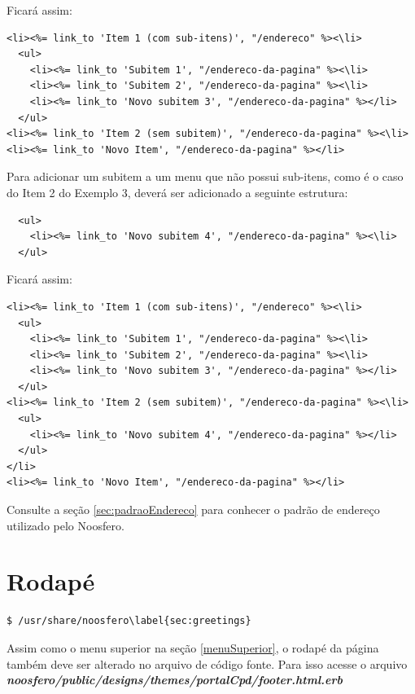 \newpage
Ficará assim:

\begin{verbatim}
<li><%= link_to 'Item 1 (com sub-itens)', "/endereco" %><\li>
  <ul>
    <li><%= link_to 'Subitem 1', "/endereco-da-pagina" %><\li>
    <li><%= link_to 'Subitem 2', "/endereco-da-pagina" %><\li>
    <li><%= link_to 'Novo subitem 3', "/endereco-da-pagina" %></li>
  </ul>
<li><%= link_to 'Item 2 (sem subitem)', "/endereco-da-pagina" %><\li>
<li><%= link_to 'Novo Item', "/endereco-da-pagina" %></li>
\end{verbatim}

Para adicionar um subitem a um menu que não possui sub-itens, como é o caso do Item 2 do Exemplo 3, deverá ser adicionado a seguinte estrutura:

\begin{verbatim}
  <ul>
    <li><%= link_to 'Novo subitem 4', "/endereco-da-pagina" %><\li>
  </ul>
\end{verbatim}

Ficará assim:

\begin{verbatim}
<li><%= link_to 'Item 1 (com sub-itens)', "/endereco" %><\li>
  <ul>
    <li><%= link_to 'Subitem 1', "/endereco-da-pagina" %><\li>
    <li><%= link_to 'Subitem 2', "/endereco-da-pagina" %><\li>
    <li><%= link_to 'Novo subitem 3', "/endereco-da-pagina" %></li>
  </ul>
<li><%= link_to 'Item 2 (sem subitem)', "/endereco-da-pagina" %><\li>
  <ul>
    <li><%= link_to 'Novo subitem 4', "/endereco-da-pagina" %></li>
  </ul>
</li>
<li><%= link_to 'Novo Item', "/endereco-da-pagina" %></li>
\end{verbatim}

Consulte a seção \ref{sec:padraoEndereco} para conhecer o padrão de endereço utilizado pelo Noosfero.

\newpage
\section{Rodapé}

\begin{lstlisting}
$ /usr/share/noosfero\label{sec:greetings}
\end{lstlisting}

Assim como o menu superior na seção \ref{menuSuperior}, o rodapé da página também deve ser alterado no arquivo de código fonte. Para isso acesse o arquivo \textbf{\textit{noosfero/public/designs/themes/portalCpd/footer.html.erb}}

